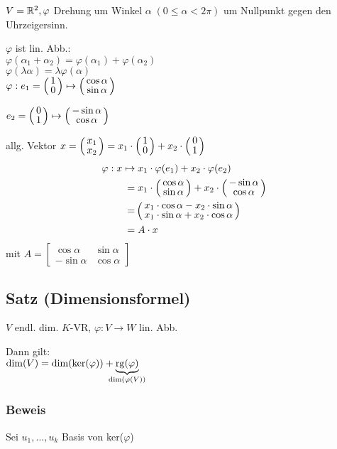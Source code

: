 $V = \mathbb{R}^2, \varphi$ Drehung um Winkel $\alpha\; (0 \leq \alpha < 2 \pi)$ um Nullpunkt gegen den Uhrzeigersinn.

$\varphi$ ist lin. Abb.:\\
$\varphi(\alpha_1 + \alpha_2) = \varphi(\alpha_1) + \varphi(\alpha_2)$\\
$\varphi(\lambda \alpha) = \lambda \varphi(\alpha)$\\

$\varphi: e_1 = \vct{1\\0} \mapsto \vct{\cos \alpha\\\sin \alpha}$

$e_2 = \vct{0\\1} \mapsto \vct{-\sin \alpha\\\cos \alpha}$

allg. Vektor $x = \vct{x_1\\x_2} = x_1 \cdot \vct{1\\0} + x_2 \cdot \vct{0\\1}$
\begin{align*}
\varphi: x \mapsto& \;x_1 \cdot \varphi(e_1) + x_2 \cdot \varphi(e_2)\\
=&\; x_1 \cdot \vct{\cos \alpha \\ \sin \alpha} + x_2 \cdot 
\vct{-\sin \alpha \\ \cos \alpha}\\
=& \vct{x_1 \cdot \cos \alpha - x_2 \cdot \sin \alpha \\
	x_1 \cdot \sin \alpha + x_2 \cdot \cos \alpha}\\
=&\; A \cdot x
\end{align*}
 mit $A = \begin{bmatrix}
\cos \alpha & \sin \alpha\\
-\sin \alpha & \cos \alpha
\end{bmatrix}$

\subsection{Satz (Dimensionsformel)}
\label{dimensionsformel}

$V$ endl. dim. $K$-VR, $\varphi: V \rightarrow W$ lin. Abb.

Dann gilt: \\$\dim(V) = \dim(\ker(\varphi)) +  \underbrace{\rg(\varphi)}_{\mathclap{\dim(\varphi(V))}}$

\subsubsection*{Beweis}
Sei $u_1,...,u_k$ Basis von ker($\varphi$)

